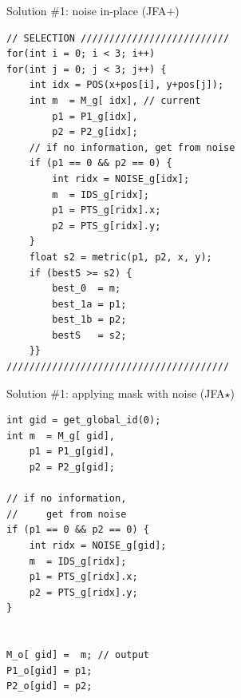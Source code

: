 \documentclass[aspectratio=169, 22pt]{beamer}
\begin{document}
\begin{frame}[fragile]{Solution \#1: noise in-place (JFA$+$)}

\vspace{-1em}
\begin{multicols}{2} %
\begin{verbatim}
// SELECTION //////////////////////////
for(int i = 0; i < 3; i++)
for(int j = 0; j < 3; j++) {
	int idx = POS(x+pos[i], y+pos[j]);
	int m  = M_g[ idx], // current
	    p1 = P1_g[idx],
	    p2 = P2_g[idx];
	// if no information, get from noise
	if (p1 == 0 && p2 == 0) {
		int ridx = NOISE_g[idx];
		m  = IDS_g[ridx];
		p1 = PTS_g[ridx].x;
		p2 = PTS_g[ridx].y;
	}
	float s2 = metric(p1, p2, x, y);
	if (bestS >= s2) {
		best_0  = m;
		best_1a = p1;
		best_1b = p2;
		bestS   = s2;
	}}
///////////////////////////////////////
\end{verbatim}
\end{multicols}

\end{frame}


\begin{frame}[fragile]{Solution \#1: applying mask with noise (JFA$\star$)}

\vspace{-1em}
\begin{multicols}{2} %
\begin{verbatim}
int gid = get_global_id(0);
int m  = M_g[ gid],
    p1 = P1_g[gid],
    p2 = P2_g[gid];

// if no information,
//     get from noise
if (p1 == 0 && p2 == 0) {
	int ridx = NOISE_g[gid];
	m  = IDS_g[ridx];
	p1 = PTS_g[ridx].x;
	p2 = PTS_g[ridx].y;
}


M_o[ gid] =  m; // output
P1_o[gid] = p1;
P2_o[gid] = p2;
\end{verbatim}
\end{multicols}

\end{frame}

\end{document}
